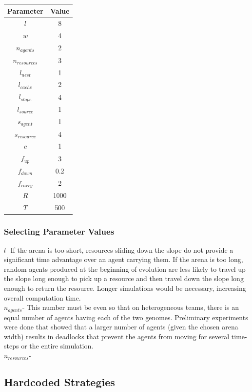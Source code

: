 \documentclass[12pt]{article}  %
\begin{document}
\begin{center}
\begin{tabular}{ |c|c| } 
 \hline
 Parameter & Value  \\ 
 \hline
 \hline
 $l$ & 8  \\ 
 \hline
 $w$ & 4  \\ 
 \hline
 $n_{agents}$ & 2  \\ 
 \hline
 $n_{resources}$ & 3  \\ 
 \hline
 $l_{nest}$ & 1  \\ 
 \hline
 $l_{cache}$ & 2  \\ 
 \hline
 $l_{slope}$ & 4  \\ 
 \hline
 $l_{source}$ & 1  \\ 
 \hline
 $s_{agent}$ & 1  \\ 
 \hline
 $s_{resource}$ & 4  \\ 
 \hline
 $c$ & 1  \\ 
 \hline
 $f_{up}$ & 3  \\ 
 \hline
 $f_{down}$ & 0.2  \\ 
 \hline
 $f_{carry}$ & 2  \\ 
 \hline
 $R$ & 1000  \\ 
 \hline
 $T$ & 500  \\ 
 \hline
 
\end{tabular}
\end{center}

\subsubsection{Selecting Parameter Values}

$l$- If the arena is too short, resources sliding down the slope do not provide a significant time advantage over an agent carrying them. If the arena is too long, random agents produced at the beginning of evolution are less likely to travel up the slope long enough to pick up a resource and then travel down the slope long enough to return the resource. Longer simulations would be necessary, increasing overall computation time. \\

$n_{agents}$- This number must be even so that on heterogeneous teams, there is an equal number of agents having each of the two genomes. Preliminary experiments were done that showed that a larger number of agents (given the chosen arena width) results in deadlocks that prevent the agents from moving for several time-steps or the entire simulation.\\

$n_{resources}$- \\

\subsection{Hardcoded Strategies}
\end{document}
